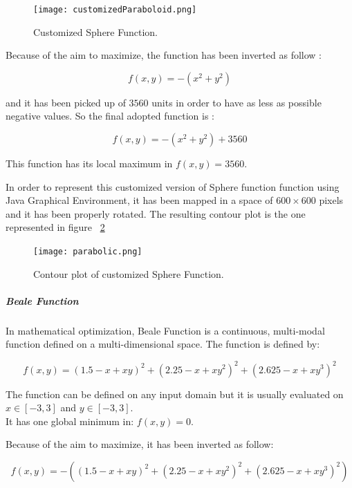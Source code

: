 \begin{figure}[h!]
	\centering
	\texttt{[image: customizedParaboloid.png]}
	\caption{Customized Sphere Function.}
	\label{fig:CustomizedParaboloidOfRevolution}
\end{figure}

Because of the aim to maximize, the function has been inverted as follow :

\begin{equation}
f(x, y) = -(x^2 + y^2)
\end{equation}

and it has been picked up of $3560$ units in order to have as less as possible negative values. So the final adopted function is :

\begin{equation}
f(x, y) = -(x^2 + y^2) + 3560
\end{equation}

This function has its local maximum in $f(x, y) = 3560$.

In order to represent this customized version of Sphere function function using Java Graphical Environment, it has been mapped in a space of $600 \times 600$ pixels and it has been properly rotated. The resulting contour plot is the one represented in figure ~\ref{fig:ContourPlotCustomizedParabolicFunction} 

\begin{figure}[h!]
	\centering
	\texttt{[image: parabolic.png]}
	\caption{Contour plot of customized Sphere Function.}
	\label{fig:ContourPlotCustomizedParabolicFunction}
\end{figure}

\subparagraph{Beale Function} In mathematical optimization, Beale Function is a continuous, multi-modal function defined on a multi-dimensional space. The function is defined by: 

\begin{equation}
f(x, y) = (1.5 - x + xy)^2 + (2.25 - x + xy^2)^2 + (2.625 - x + xy^3)^2
\end{equation}

The function can be defined on any input domain but it is usually evaluated on $x \in [-3, 3]$ and $y \in [-3, 3]$. \\

It has one global minimum in: $f(x, y) = 0$. 

Because of the aim to maximize, it has been inverted as follow:

\begin{equation}
f(x, y) = -((1.5 - x + xy)^2 + (2.25 - x + xy^2)^2 + (2.625 - x + xy^3)^2)
\end{equation}

